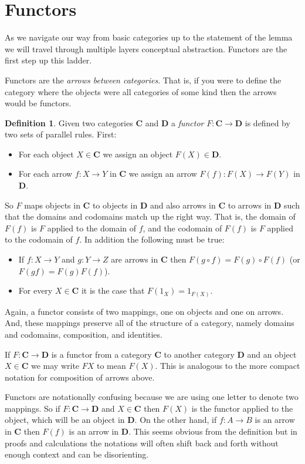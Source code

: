 \documentclass[12pt]{article}
\theoremstyle{definition}
\theoremstyle{definition}
\newtheorem{defn}{Definition}[]
\theoremstyle{definition}
\numberwithin{equation}{section}
\newcommand{\cat}[1]{\mathbf{#1}}      %
\newcommand{\CC}{\cat{C}}
\newcommand{\DD}{\cat{D}}
\def\ni{\goodbreak\noindent}
\begin{document}
\section{Functors}

As we navigate our way from basic categories up to the statement of the lemma we will
travel through multiple layers conceptual abstraction. Functors are the first step up this
ladder.

Functors are the {\it arrows between categories}. That is, if you were to define the
category where the objects were all categories of some kind then the arrows would be
functors.

\goodbreak
\begin{defn}
Given two categories $\CC$ and $\DD$ a {\it functor} $F : \CC \to \DD$ is defined by two
sets of parallel rules. First:
\begin{itemize}
\item For each object $X \in \CC$ we assign an object $F(X) \in \DD$.
\item For each arrow $f: X \to Y$ in $\CC$ we assign an arrow $F(f): F(X) \to F(Y)$ in
$\DD$.
\end{itemize}
\ni
So $F$ maps objects in $\CC$ to objects in $\DD$ and also arrows in $\CC$ to arrows in
$\DD$ such that the domains and codomains match up the right way. That is, the domain of
$F(f)$ is $F$ applied to the domain of $f$, and the codomain of $F(f)$ is $F$ applied to
the codomain of $f$. In addition the following must be true:
\begin{itemize}
\item If $f:X \to Y$ and $g: Y \to Z$ are arrows in $\CC$ then $F(g \circ f) = F(g) \circ
F(f)$ (or $F(gf) = F(g)F(f)$).
\item For every $X \in \CC$ it is the case that $F(1_X) = 1_{F(X)}$.
\end{itemize}

\end{defn}
\ni
Again, a functor consists of two mappings, one on objects and one on arrows. And, these
mappings preserve all of the structure of a category, namely domains and codomains,
composition, and identities.

If $F: \CC \to \DD$ is a functor from a category $\CC$ to another category $\DD$ and an
object $X \in \CC$ we may write $F X$ to mean $F(X)$. This is analogous to the more
compact notation for composition of arrows above.

Functors are notationally confusing because we are using one letter to denote two
mappings. So if $F: \CC \to \DD$ and $X \in \CC$ then $F(X)$ is the functor applied to the
object, which will be an object in $\DD$. On the other hand, if $f : A \to B$ is an arrow
in $\CC$ then $F(f)$ is an arrow in $\DD$. This seems obvious from the definition but in
proofs and calculations the notations will often shift back and forth without enough
context and can be disorienting.
\end{document}
